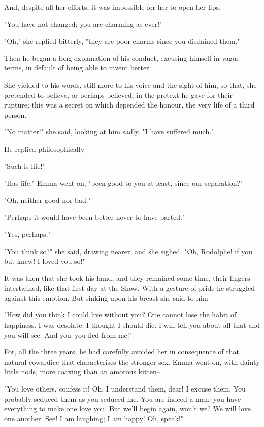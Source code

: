 \documentclass[11pt,twocolumn]{ltugboat}
\begin{document}
And, despite all her efforts, it was impossible for her to open her
lips.

"You have not changed; you are charming as ever!"

"Oh," she replied bitterly, "they are poor charms since you disdained
them."

Then he began a long explanation of his conduct, excusing himself in
vague terms, in default of being able to invent better.

She yielded to his words, still more to his voice and the sight of him,
so that, she pretended to believe, or perhaps believed; in the pretext
he gave for their rupture; this was a secret on which depended the
honour, the very life of a third person.

"No matter!" she said, looking at him sadly. "I have suffered much."

He replied philosophically--

"Such is life!"

"Has life," Emma went on, "been good to you at least, since our
separation?"

"Oh, neither good nor bad."

"Perhaps it would have been better never to have parted."

"Yes, perhaps."

"You think so?" she said, drawing nearer, and she sighed. "Oh, Rodolphe!
if you but knew! I loved you so!"

It was then that she took his hand, and they remained some time, their
fingers intertwined, like that first day at the Show. With a gesture of
pride he struggled against this emotion. But sinking upon his breast she
said to him--

"How did you think I could live without you? One cannot lose the habit
of happiness. I was desolate. I thought I should die. I will tell you
about all that and you will see. And you--you fled from me!"

For, all the three years, he had carefully avoided her in consequence
of that natural cowardice that characterises the stronger sex. Emma went
on, with dainty little nods, more coaxing than an amorous kitten--

"You love others, confess it! Oh, I understand them, dear! I excuse
them. You probably seduced them as you seduced me. You are indeed a man;
you have everything to make one love you. But we'll begin again, won't
we? We will love one another. See! I am laughing; I am happy! Oh,
speak!"
\end{document}
